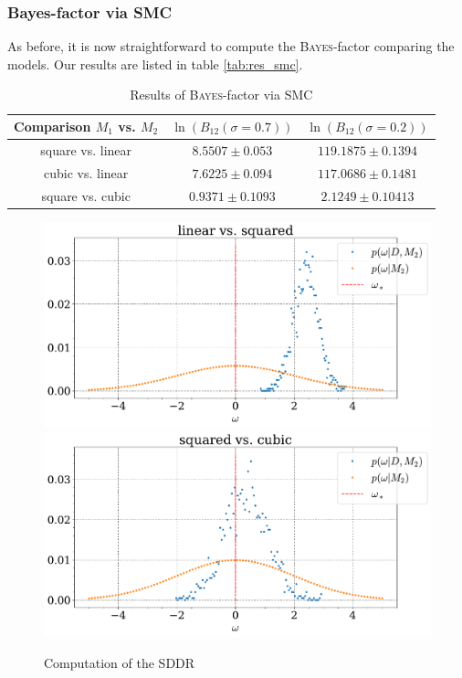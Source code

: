 \documentclass[%
 reprint,
 amsmath,amssymb,
 aps,
]{revtex4-1}
\begin{document}
\subsubsection{\textbf{Bayes-factor via SMC}}
\noindent As before, it is now straightforward to compute the \textsc{Bayes}-factor comparing the models. Our results are listed in table \eqref{tab:res_smc}.

\begin{table}[H]
	{\renewcommand{\arraystretch}{1.3}
		\begin{tabular}{|c|c|c|}
			\hline
			Comparison $M_1$ vs. $M_2$ & $\ln(B_{12}(\sigma=0.7))$& $\ln(B_{12}(\sigma=0.2))$  \\
			\hline
			square vs. linear& $8.5507\pm0.053$&$119.1875\pm0.1394$\\
			cubic vs. linear & $7.6225\pm0.094$&$117.0686\pm0.1481$\\
			square vs. cubic&$0.9371\pm0.1093$ &$2.1249\pm0.10413$\\
			\hline
	\end{tabular}}
	\caption{Results of \textsc{Bayes}-factor via SMC}
	\label{tab:res_smc}
\end{table}

\begin{figure}[H]
	\centering
	\includegraphics[width=0.9\linewidth]{SDDR_linear vs. squared_sigma_07a+.pdf}
	\includegraphics[width=0.9\linewidth]{SDDR_squared vs. cubic_sigma_07a+.pdf}
	\caption{Computation of the SDDR}
	\label{fig:sddr}
\end{figure}
\end{document}

